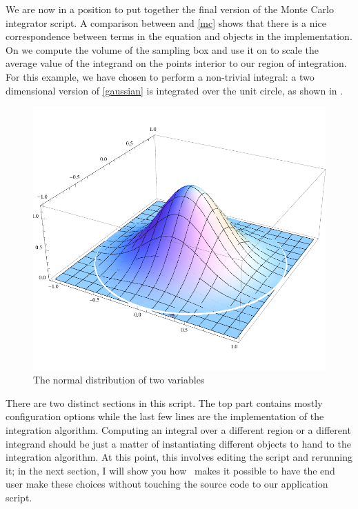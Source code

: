 We are now in a position to put together the final version of the Monte Carlo integrator
script.
%
%
A comparison between  and \eqref{mc} shows that there is a nice
correspondence between terms in the equation and objects in the implementation. On
 we compute the volume of the sampling box and use it on
 to scale the average value of the integrand on the points interior to
our region of integration. For this example, we have chosen to perform a non-trivial integral:
a two dimensional version of \eqref{gaussian} is integrated over the unit circle, as shown in
.
%
\begin{figure}
\centering
\includegraphics[scale=0.60]{figures/gaussian.pdf}
\caption{The normal distribution of two variables\label{fig:gaussian}}
\end{figure}
%
There are two distinct sections in this script. The top part contains mostly configuration
options while the last few lines are the implementation of the integration algorithm. Computing
an integral over a different region or a different integrand should be just a matter of
instantiating different objects to hand to the integration algorithm. At this point, this
involves editing the script and rerunning it; in the next section, I will show you how \pyre\
makes it possible to have the end user make these choices without touching the source code to
our application script.

